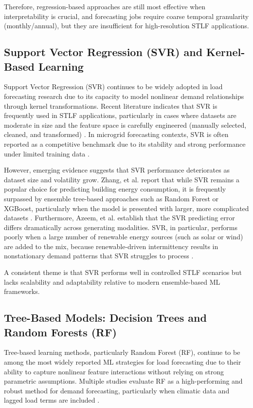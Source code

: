 \documentclass[conference]{IEEEtran}
\begin{document}
Therefore, regression-based approaches are still most effective when interpretability is crucial, and forecasting jobs require coarse temporal granularity (monthly/annual), but they are insufficient for high-resolution STLF applications.

\subsection{Support Vector Regression (SVR) and Kernel-Based Learning}

Support Vector Regression (SVR) continues to be widely adopted in load forecasting research due to its capacity to model nonlinear demand relationships through kernel transformations. Recent literature indicates that SVR is frequently used in STLF applications, particularly in cases where datasets are moderate in size and the feature space is carefully engineered (manually selected, cleaned, and transformed) \cite{khalil2022}. In microgrid forecasting contexts, SVR is often reported as a competitive benchmark due to its stability and strong performance under limited training data \cite{wazirali2023}.

However, emerging evidence suggests that SVR performance deteriorates as dataset size and volatility grow. Zhang, et al. \cite{zhang2021} report that while SVR remains a popular choice for predicting building energy consumption, it is frequently surpassed by ensemble tree-based approaches such as Random Forest or XGBoost, particularly when the model is presented with larger, more complicated datasets \cite{zhang2021}. Furthermore, Azeem, et al. \cite{azeem2021} establish that the SVR predicting error differs dramatically across generating modalities. SVR, in particular, performs poorly when a large number of renewable energy sources (such as solar or wind) are added to the mix, because renewable-driven intermittency results in nonstationary demand patterns that SVR struggles to process \cite{azeem2021}.

A consistent theme is that SVR performs well in controlled STLF scenarios but lacks scalability and adaptability relative to modern ensemble-based ML frameworks.

\subsection{Tree-Based Models: Decision Trees and Random Forests (RF)}

Tree-based learning methods, particularly Random Forest (RF), continue to be among the most widely reported ML strategies for load forecasting due to their ability to capture nonlinear feature interactions without relying on strong parametric assumptions. Multiple studies evaluate RF as a high-performing and robust method for demand forecasting, particularly when climatic data and lagged load terms are included \cite{habbak2023,azeem2021}.
\end{document}
